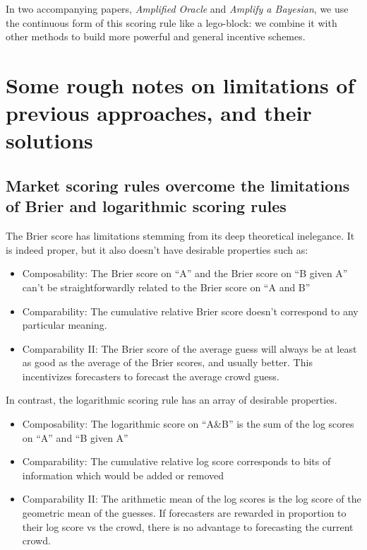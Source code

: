 \documentclass[]{article}
\providecommand{\tightlist}{%
  \setlength{\itemsep}{0pt}\setlength{\parskip}{0pt}}
\begin{document}
In two accompanying papers, \emph{Amplified Oracle} and \emph{Amplify a
Bayesian}, we use the continuous form of this scoring rule like a
lego-block: we combine it with other methods to build more powerful and
general incentive schemes.

\hypertarget{some-rough-notes-on-limitations-of-previous-approaches-and-their-solutions}{%
\section{Some rough notes on limitations of previous approaches, and
their
solutions}\label{some-rough-notes-on-limitations-of-previous-approaches-and-their-solutions}}

\hypertarget{market-scoring-rules-overcome-the-limitations-of-brier-and-logarithmic-scoring-rules}{%
\subsection{Market scoring rules overcome the limitations of Brier and
logarithmic scoring
rules}\label{market-scoring-rules-overcome-the-limitations-of-brier-and-logarithmic-scoring-rules}}

The Brier score has limitations stemming from its deep theoretical
inelegance. It is indeed proper, but it also doesn't have desirable
properties such as:

\begin{itemize}
\tightlist
\item
  Composability: The Brier score on ``A'' and the Brier score on ``B
  given A'' can't be straightforwardly related to the Brier score on ``A
  and B''
\item
  Comparability: The cumulative relative Brier score doesn't correspond
  to any particular meaning.
\item
  Comparability II: The Brier score of the average guess will always be
  at least as good as the average of the Brier scores, and usually
  better. This incentivizes forecasters to forecast the average crowd
  guess.
\end{itemize}

In contrast, the logarithmic scoring rule has an array of desirable
properties.

\begin{itemize}
\tightlist
\item
  Composability: The logarithmic score on ``A\&B'' is the sum of the log
  scores on ``A'' and ``B given A''
\item
  Comparability: The cumulative relative log score corresponds to bits
  of information which would be added or removed
\item
  Comparability II: The arithmetic mean of the log scores is the log
  score of the geometric mean of the guesses. If forecasters are
  rewarded in proportion to their log score vs the crowd, there is no
  advantage to forecasting the current crowd.
\end{itemize}
\end{document}

